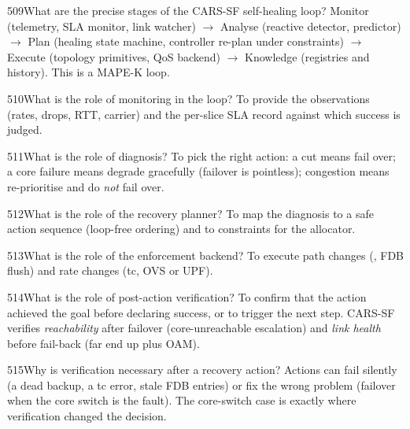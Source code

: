 \begin{qa}{509}{What are the precise stages of the CARS-SF self-healing loop?}
Monitor (telemetry, SLA monitor, link watcher) $\rightarrow$ Analyse (reactive detector, predictor) $\rightarrow$
Plan (healing state machine, controller re-plan under constraints) $\rightarrow$ Execute (topology primitives, QoS
backend) $\rightarrow$ Knowledge (registries and history). This is a MAPE-K loop.
\end{qa}

\begin{qa}{510}{What is the role of monitoring in the loop?}
To provide the observations (rates, drops, RTT, carrier) and the per-slice SLA record against which success is
judged.
\end{qa}

\begin{qa}{511}{What is the role of diagnosis?}
To pick the right action: a cut means fail over; a core failure means degrade gracefully (failover is pointless);
congestion means re-prioritise and do \emph{not} fail over.
\end{qa}

\begin{qa}{512}{What is the role of the recovery planner?}
To map the diagnosis to a safe action sequence (loop-free ordering) and to constraints for the allocator.
\end{qa}

\begin{qa}{513}{What is the role of the enforcement backend?}
To execute path changes (, FDB flush) and rate changes (tc, OVS or UPF).
\end{qa}

\begin{qa}{514}{What is the role of post-action verification?}
To confirm that the action achieved the goal before declaring success, or to trigger the next step. CARS-SF verifies
\emph{reachability} after failover (core-unreachable escalation) and \emph{link health} before fail-back (far end up
plus OAM).
\end{qa}

\begin{qa}{515}{Why is verification necessary after a recovery action?}
Actions can fail silently (a dead backup, a tc error, stale FDB entries) or fix the wrong problem (failover when the
core switch is the fault). The core-switch case is exactly where verification changed the decision.
\end{qa}

